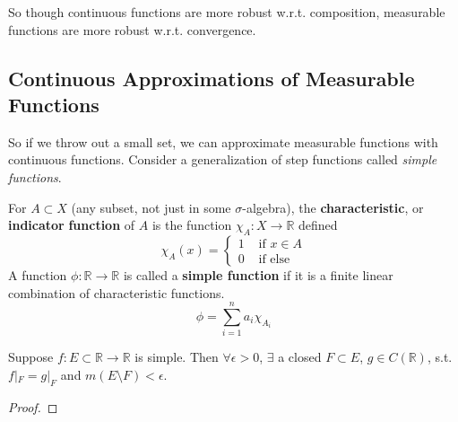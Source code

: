   So though continuous functions are more robust w.r.t. composition, measurable functions are more robust w.r.t. convergence. 

\subsection{Continuous Approximations of Measurable Functions}

  So if we throw out a small set, we can approximate measurable functions with continuous functions. Consider a generalization of step functions called \textit{simple functions}. 

  \begin{definition}
    For $A \subset X$ (any subset, not just in some $\sigma$-algebra), the \textbf{characteristic}, or \textbf{indicator} \textbf{function} of $A$ is the function $\chi_A : X \longrightarrow \mathbb{R}$ defined 
    \begin{equation}
      \chi_A (x) = \begin{cases} 1 & \text{ if } x \in A \\ 0 & \text{ if else} \end{cases}
    \end{equation}
    A function $\phi: \mathbb{R} \longrightarrow \mathbb{R}$ is called a \textbf{simple function} if it is a finite linear combination of characteristic functions. 
    \begin{equation}
      \phi = \sum_{i=1}^n a_i \chi_{A_i}
    \end{equation}
  \end{definition} 

  \begin{lemma}
    Suppose $f: E \subset \mathbb{R} \to \mathbb{R}$ is simple. Then $\forall \epsilon > 0$, $\exists$ a closed $F \subset E$, $g \in C(\mathbb{R})$, s.t. $f|_F = g |_F$ and $m(E \setminus F) < \epsilon$. 
  \end{lemma}
  \begin{proof}
    
  \end{proof}

